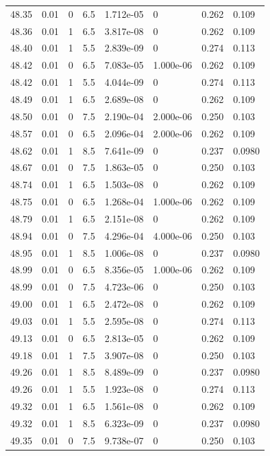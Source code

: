 \documentclass[preview]{standalone}
\begin{document}
{{{{{{{{{{{{{{{{\begin{tabular}{L{1.2cm}C{1.2cm} C{0.3cm}C{0.5cm} C{1.4cm}C{1.4cm} C{1.4cm}C{1.4cm}}
  48.35  &  0.01  & 0     & 6.5 &  1.712e-05  & 0  & 0.262 &  0.109   \\ 
  48.36  &  0.01  & 1     & 6.5 &  3.817e-08  & 0  & 0.262 &  0.109   \\ 
  48.40  &  0.01  & 1     & 5.5 &  2.839e-09  & 0  & 0.274 &  0.113   \\ 
  48.42  &  0.01  & 0     & 6.5 &  7.083e-05  & 1.000e-06  & 0.262 &  0.109   \\ 
  48.42  &  0.01  & 1     & 5.5 &  4.044e-09  & 0  & 0.274 &  0.113   \\ 
  48.49  &  0.01  & 1     & 6.5 &  2.689e-08  & 0  & 0.262 &  0.109   \\ 
  48.50  &  0.01  & 0     & 7.5 &  2.190e-04  & 2.000e-06  & 0.250 &  0.103   \\ 
  48.57  &  0.01  & 0     & 6.5 &  2.096e-04  & 2.000e-06  & 0.262 &  0.109   \\ 
  48.62  &  0.01  & 1     & 8.5 &  7.641e-09  & 0  & 0.237 &  0.0980   \\ 
  48.67  &  0.01  & 0     & 7.5 &  1.863e-05  & 0  & 0.250 &  0.103   \\ 
  48.74  &  0.01  & 1     & 6.5 &  1.503e-08  & 0  & 0.262 &  0.109   \\ 
  48.75  &  0.01  & 0     & 6.5 &  1.268e-04  & 1.000e-06  & 0.262 &  0.109   \\ 
  48.79  &  0.01  & 1     & 6.5 &  2.151e-08  & 0  & 0.262 &  0.109   \\ 
  48.94  &  0.01  & 0     & 7.5 &  4.296e-04  & 4.000e-06  & 0.250 &  0.103   \\ 
  48.95  &  0.01  & 1     & 8.5 &  1.006e-08  & 0  & 0.237 &  0.0980   \\ 
  48.99  &  0.01  & 0     & 6.5 &  8.356e-05  & 1.000e-06  & 0.262 &  0.109   \\ 
  48.99  &  0.01  & 0     & 7.5 &  4.723e-06  & 0  & 0.250 &  0.103   \\ 
  49.00  &  0.01  & 1     & 6.5 &  2.472e-08  & 0  & 0.262 &  0.109   \\ 
  49.03  &  0.01  & 1     & 5.5 &  2.595e-08  & 0  & 0.274 &  0.113   \\ 
  49.13  &  0.01  & 0     & 6.5 &  2.813e-05  & 0  & 0.262 &  0.109   \\ 
  49.18  &  0.01  & 1     & 7.5 &  3.907e-08  & 0  & 0.250 &  0.103   \\ 
  49.26  &  0.01  & 1     & 8.5 &  8.489e-09  & 0  & 0.237 &  0.0980   \\ 
  49.26  &  0.01  & 1     & 5.5 &  1.923e-08  & 0  & 0.274 &  0.113   \\ 
  49.32  &  0.01  & 1     & 6.5 &  1.561e-08  & 0  & 0.262 &  0.109   \\ 
  49.32  &  0.01  & 1     & 8.5 &  6.323e-09  & 0  & 0.237 &  0.0980   \\ 
  49.35  &  0.01  & 0     & 7.5 &  9.738e-07  & 0  & 0.250 &  0.103   \\ 
\hline 
\end{tabular} 

}}}}}}}}}}}}}}}}
\end{document}
